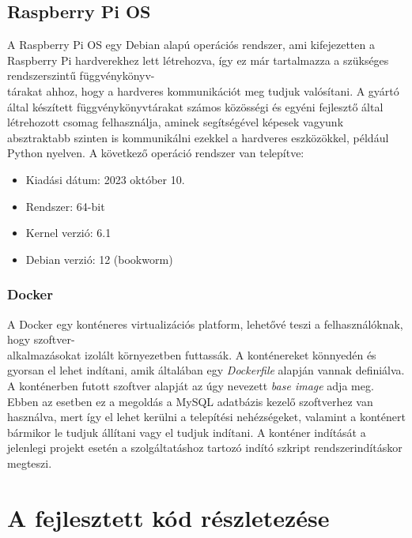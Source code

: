 \documentclass[11pt, a4paper]{article}
\begin{document}
		\subsection{Raspberry Pi OS}
			\begin{flushleft}
				\justifying
				A Raspberry Pi OS egy Debian alapú operációs rendszer, ami kifejezetten a Raspberry Pi hardverekhez lett létrehozva, így ez már tartalmazza a szükséges rendszerszintű függvénykönyv-\\tárakat ahhoz, hogy a hardveres kommunikációt meg tudjuk valósítani. A gyártó által készített függvénykönyvtárakat számos közösségi és egyéni fejlesztő által létrehozott csomag felhasználja, aminek segítségével képesek vagyunk absztraktabb szinten is kommunikálni ezekkel a hardveres eszközökkel, például Python nyelven. A következő operáció rendszer van telepítve:
				\begin{itemize}
					\item Kiadási dátum: 2023 október 10.
					\item Rendszer: 64-bit
					\item Kernel verzió: 6.1
					\item Debian verzió: 12 (bookworm)
				\end{itemize}

			\end{flushleft}
		\subsubsection{Docker}
			\begin{flushleft}
				\justifying
				A Docker egy konténeres virtualizációs platform, lehetővé teszi a felhasználóknak, hogy szoftver-\\alkalmazásokat izolált környezetben futtassák. A konténereket könnyedén és gyorsan el lehet indítani, amik általában egy \emph{Dockerfile} alapján vannak definiálva. A konténerben futott szoftver alapját az úgy nevezett \emph{base image} adja meg. Ebben az esetben ez a megoldás a MySQL adatbázis kezelő szoftverhez van használva, mert így el lehet kerülni a telepítési nehézségeket, valamint a konténert bármikor le tudjuk állítani vagy el tudjuk indítani. A konténer indítását a jelenlegi projekt esetén a szolgáltatáshoz tartozó indító szkript rendszerindításkor megteszi.
			\end{flushleft}

	\section{A fejlesztett kód részletezése}
\end{document}
